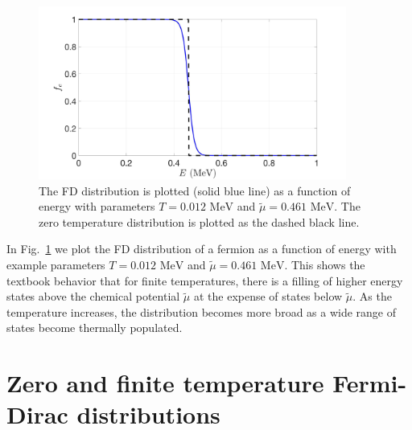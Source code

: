 \documentclass[sn-mathphys,Numbered]{sn-jnl}
\newcommand{\rf}[1]{Fig.~{\ref{#1}}}
\newcommand*{\MeV}{\text{ MeV}}
\begin{document}
\begin{figure}[ht]
\centering
\includegraphics[width=0.9\textwidth]{./plot/Electron_distribution001}
\caption{The FD distribution is plotted (solid blue line) as a function of energy with parameters $T=0.012\MeV$ and $\widetilde\mu=0.461\MeV$. The zero temperature distribution is plotted as the dashed black line.}
\label{Electron_001}
\end{figure}

In \rf{Electron_001} we plot the FD distribution of a fermion as a function of energy with example parameters $T=0.012\MeV$ and $\widetilde\mu=0.461\MeV$. This shows the textbook behavior that for finite temperatures, there is a filling of higher energy states above the chemical potential $\widetilde\mu$ at the expense of states below $\widetilde\mu$. As the temperature increases, the distribution becomes more broad as a wide range of states become thermally populated.

\section{Zero and finite temperature Fermi-Dirac distributions}
\label{NewFermi}
\end{document}
